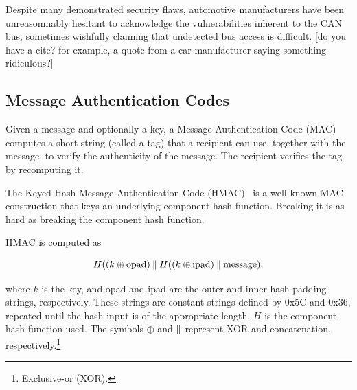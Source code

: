 Despite many demonstrated security flaws, automotive 
manufacturers have been unreasomnably hesitant to acknowledge the vulnerabilities inherent to the CAN bus,
sometimes wishfully claiming that undetected bus access is difficult. [do you have a cite? for example,
a quote from a car manufacturer saying something ridiculous?]

\subsection{Message Authentication Codes}

Given a message and optionally a key, a Message Authentication Code (MAC) computes a short string (called a tag) 
that a recipient can use, together with the message, to verify the authenticity of the message.  The recipient 
verifies the tag by recomputing it.

The Keyed-Hash Message Authentication Code (HMAC)~\cite{HMAC,FIPS-198-1} 
is a well-known MAC construction that keys an underlying component hash function.  
Breaking it is as hard as breaking the component hash function.

HMAC is computed as

\begin{equation}
H((k\oplus \text{opad})\mathbin{\|} H((k\oplus \text{ipad})\mathbin{\|} \text{message}) ,
\end{equation}

\noindent
where $k$ is the key, and opad and ipad are the outer and inner hash padding strings, respectively. 
These strings are constant strings defined by 0x5C and 0x36, repeated until the hash input is of the appropriate length. 
$H$ is the component hash function used. 
The symbols $\oplus$ and $\mathbin{\|}$ represent XOR and concatenation, respectively.\footnote{Exclusive-or (XOR).}




